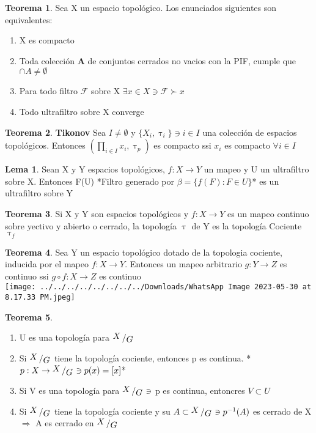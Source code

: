 \documentclass{article}
\theoremstyle{definition}
\newtheorem{theorem}{Teorema}[section]
\newtheorem{lemma}{Lema}[section]
\newcommand{\bigslant}[2]{{\raisebox{.2em}{$#1$}\left/\raisebox{-.2em}{$#2$}\right.}}
\begin{document}
\begin{theorem}
	Sea X un espacio topológico. Los enunciados siguientes son equivalentes:
	\begin{enumerate}
		\item X es compacto
		\item Toda colección \textbf{A} de conjuntos cerrados no vacios con la PIF, cumple que $\cap A\neq\emptyset$
		\item Para todo filtro $\mathcal{F}$ sobre X $\exists x\in X\ni \mathcal{F} \succ x$
		\item Todo ultrafiltro sobre X converge
	\end{enumerate}
\end{theorem}
\begin{theorem}\textbf{Tikonov}
	Sea $I\neq\emptyset$ y $\{X_i,\uptau_i\}\ni i\in I$ una colección de espacios topológicos. Entonces $(\prod_{i\in I}x_i,\uptau_p)$ es compacto ssi $x_i$ es compacto $\forall i \in I$
\end{theorem}
\begin{lemma}
	Sean X y Y espacios topológicos, $f:X\to Y$ un mapeo y U un ultrafiltro sobre X. Entonces F(U) *Filtro generado por $\beta = \{f(F):F\in U\}$* es un ultrafiltro sobre Y
\end{lemma}
\begin{theorem}
	Si X y Y son espacios topológicos y $f:X\to Y$ es un mapeo continuo sobre yectivo y abierto o cerrado, la topología $\uptau$ de Y es la topología Cociente $\uptau_f$
\end{theorem}
\begin{theorem}
	Sea Y un espacio topológico dotado de la topologia cociente, inducida por el mapeo $f:X\to Y$. Entonces un mapeo arbitrario $g:Y\to Z$ es continuo ssi $g\circ f:X\to Z$ es continuo\\
\texttt{[image: ../../../../../../../../Downloads/WhatsApp Image 2023-05-30 at 8.17.33 PM.jpeg]} 
\end{theorem}
\begin{theorem}

	\begin{enumerate}
		\item U es una topología para $\bigslant{X}{G}$
		\item Si $\bigslant{X}{G}$ tiene la topología cociente, entonces p es continua. *$p:X\to\bigslant{X}{G}\ni p(x)=[x]$*
		\item Si V es una topología para $\bigslant{X}{G}\ni$ p es continua, entoncres $V\subset U$
		\item Si $\bigslant{X}{G}$ tiene la topología cociente y su $A\subset \bigslant{X}{G}\ni p^{-1}(A)$ es cerrado de X $\Rightarrow$ A es cerrado en $\bigslant{X}{G}$
	\end{enumerate}
\end{theorem}
\end{document}
